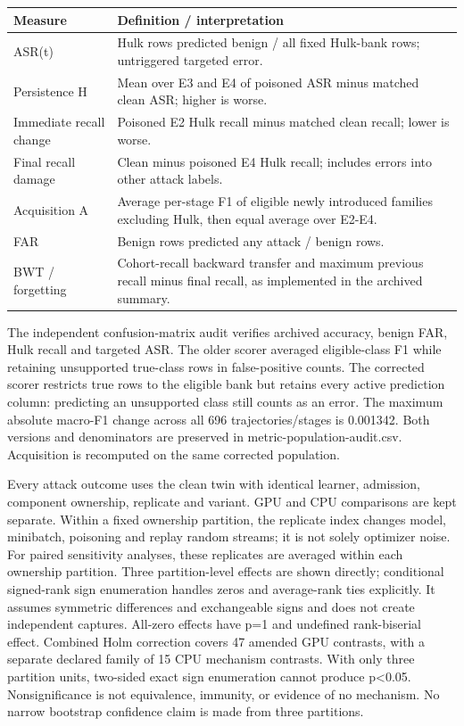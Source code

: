 \documentclass[
  10pt,
]{article}
\begin{document}
\begin{longtable}[]{@{}
  >{\raggedright\arraybackslash}p{}
  >{\raggedright\arraybackslash}p{}@{}}
\toprule
Measure & Definition / interpretation \\
\midrule
\endhead
ASR(t) & Hulk rows predicted benign / all fixed Hulk-bank rows;
untriggered targeted error. \\
Persistence H & Mean over E3 and E4 of poisoned ASR minus matched clean
ASR; higher is worse. \\
Immediate recall change & Poisoned E2 Hulk recall minus matched clean
recall; lower is worse. \\
Final recall damage & Clean minus poisoned E4 Hulk recall; includes
errors into other attack labels. \\
Acquisition A & Average per-stage F1 of eligible newly introduced
families excluding Hulk, then equal average over E2-E4. \\
FAR & Benign rows predicted any attack / benign rows. \\
BWT / forgetting & Cohort-recall backward transfer and maximum previous
recall minus final recall, as implemented in the archived summary. \\
\bottomrule
\end{longtable}

The independent confusion-matrix audit verifies archived accuracy,
benign FAR, Hulk recall and targeted ASR. The older scorer averaged
eligible-class F1 while retaining unsupported true-class rows in
false-positive counts. The corrected scorer restricts true rows to the
eligible bank but retains every active prediction column: predicting an
unsupported class still counts as an error. The maximum absolute
macro-F1 change across all 696 trajectories/stages is 0.001342. Both
versions and denominators are preserved in metric-population-audit.csv.
Acquisition is recomputed on the same corrected population.

Every attack outcome uses the clean twin with identical learner,
admission, component ownership, replicate and variant. GPU and CPU
comparisons are kept separate. Within a fixed ownership partition, the
replicate index changes model, minibatch, poisoning and replay random
streams; it is not solely optimizer noise. For paired sensitivity
analyses, these replicates are averaged within each ownership partition.
Three partition-level effects are shown directly; conditional
signed-rank sign enumeration handles zeros and average-rank ties
explicitly. It assumes symmetric differences and exchangeable signs and
does not create independent captures. All-zero effects have p=1 and
undefined rank-biserial effect. Combined Holm correction covers 47
amended GPU contrasts, with a separate declared family of 15 CPU
mechanism contrasts. With only three partition units, two-sided exact
sign enumeration cannot produce p\textless0.05. Nonsignificance is not
equivalence, immunity, or evidence of no mechanism. No narrow bootstrap
confidence claim is made from three partitions.
\end{document}
